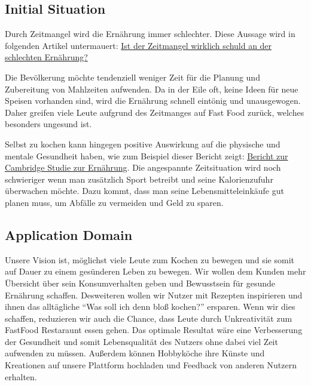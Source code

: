 \documentclass[12pt]{article}
\theoremstyle{definition}
\begin{document}
\subsection{Initial Situation}
Durch Zeitmangel wird die Ernährung immer schlechter. Diese Aussage wird in folgenden Artikel untermauert: \hyperlink{https://www.gesund.at/ernaehrung/gesunde-ernaehrung-zeit/}{\color{blue}Ist der Zeitmangel wirklich schuld an der schlechten Ernährung?}


Die Bevölkerung möchte tendenziell weniger Zeit für die Planung und Zubereitung von Mahlzeiten aufwenden. Da in der Eile oft, keine Ideen für neue Speisen vorhanden sind, wird die Ernährung schnell eintönig und unausgewogen. Daher greifen viele Leute aufgrund des Zeitmanges auf Fast Food zurück, welches besonders ungesund ist. 

Selbst zu kochen kann hingegen positive Auswirkung auf die physische und mentale Gesundheit haben, wie zum Beispiel dieser Bericht zeigt:
\hyperlink{https://www.huffpost.com/entry/cooking-longevity_n_1518466?guccounter=1&guce_referrer=aHR0cHM6Ly93d3cuZ29vZ2xlLmNvbS8&guce_referrer_sig=AQAAAD3kSnBoydOhZwbnnWL-ifUA6FwaQfkqdJv0bSVaUdyuhl4C6NVEeAAiluGbP9UVwuqUbucdfEpI52AC8rfEJkO3KkpP64ZMdVRKjGck46ZzFhcoiL22O4cm3ARE7xv_Iy1_wFgeMpTcOUYfxZ8hvpvg-gfYQlpe_FKIpiW4nF30}{\color{blue}Bericht zur Cambridge Studie zur Ernährung}.
 Die angespannte Zeitsituation wird noch schwieriger wenn man zusätzlich Sport betreibt und seine Kalorienzufuhr überwachen möchte. Dazu kommt, dass man seine Lebensmitteleinkäufe gut planen muss, um Abfälle zu vermeiden und Geld zu sparen.

\subsection{Application Domain}
Unsere Vision ist, möglichst viele Leute zum Kochen zu bewegen und sie somit auf Dauer zu einem gesünderen Leben zu bewegen. Wir wollen dem Kunden mehr Übersicht über sein Konsumverhalten geben und Bewusstsein für gesunde Ernährung schaffen. Desweiteren wollen wir Nutzer mit Rezepten inspirieren und ihnen das alltägliche ``Was soll ich denn bloß kochen?''        ersparen. Wenn wir dies schaffen, reduzieren wir auch die Chance, dass Leute durch Unkreativität zum FastFood Restaraunt essen gehen. Das optimale Resultat wäre eine Verbesserung der Gesundheit und somit Lebensqualität des Nutzers ohne dabei viel Zeit aufwenden zu müssen. Außerdem können Hobbyköche ihre Künste und Kreationen auf unsere Plattform hochladen und Feedback von anderen Nutzern erhalten. 
\end{document}

